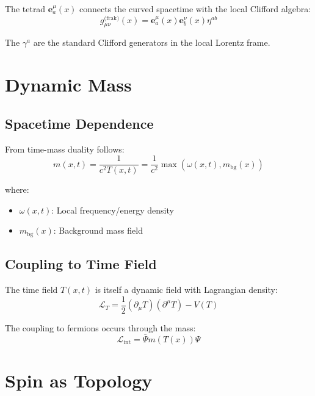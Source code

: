 	The tetrad $\mathbf{e}^\mu_a(x)$ connects the curved spacetime with the local Clifford algebra:
	\begin{equation}
		g_{\mu\nu}^{\text{(frak)}}(x) = \mathbf{e}^\mu_a(x) \mathbf{e}^\nu_b(x) \eta^{ab}
		\label{eq:tetrad_metric}
	\end{equation}
	
	The $\gamma^a$ are the standard Clifford generators in the local Lorentz frame.
	
	\section{Dynamic Mass}
	
	\subsection{Spacetime Dependence}
	
	From time-mass duality follows:
	\begin{equation}
		m(x,t) = \frac{1}{c^2 T(x,t)} = \frac{1}{c^2} \max(\omega(x,t), m_{\text{bg}}(x))
		\label{eq:dynamic_mass}
	\end{equation}
	
	where:
	\begin{itemize}
		\item $\omega(x,t)$: Local frequency/energy density
		\item $m_{\text{bg}}(x)$: Background mass field
	\end{itemize}
	
	\subsection{Coupling to Time Field}
	
	The time field $T(x,t)$ is itself a dynamic field with Lagrangian density:
	\begin{equation}
		\mathcal{L}_T = \frac{1}{2}(\partial_\mu T)(\partial^\mu T) - V(T)
		\label{eq:time_lagrangian}
	\end{equation}
	
	The coupling to fermions occurs through the mass:
	\begin{equation}
		\mathcal{L}_{\text{int}} = \bar{\Psi} m(T(x)) \Psi
		\label{eq:fermion_time_coupling}
	\end{equation}
	
	\section{Spin as Topology}
	
